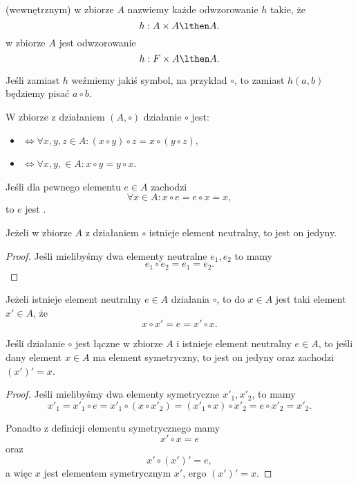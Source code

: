  (wewnętrznym) w zbiorze $A$ nazwiemy każde odwzorowanie $h$ takie, że
$$ h : A \times A \lthen A. $$
 w zbiorze $A$ jest odwzorowanie
$$ h : F \times A \lthen A. $$

Jeśli zamiast $h$ weźmiemy jakiś symbol, na przykład $\circ$, to zamiast $h(a, b)$ będziemy pisać $a \circ b$.

\begin{definition}
    W zbiorze z działaniem $(A, \circ)$ działanie $\circ$ jest:
    \begin{itemize}[--]
        \item {} $\iff \forall x, y, z \in A : (x \circ y) \circ z = x \circ (y \circ z)$,
        \item {} $\iff \forall x, y, \in A : x \circ y = y \circ x$.
    \end{itemize}
\end{definition}

Jeśli dla pewnego elementu $e \in A$ zachodzi
$$ \forall x \in A : x \circ e = e \circ x = x, $$
to $e$ jest .

\begin{fact}
    Jeżeli w zbiorze $A$ z działaniem $\circ$ istnieje element neutralny, to jest on jedyny.
\end{fact}
\begin{proof}
    Jeśli mielibyśmy dwa elementy neutralne $e_1, e_2$ to mamy
    $$ e_1 \circ e_2 = e_1 = e_2. $$
\end{proof}

Jeżeli istnieje element neutralny $e \in A$ działania $\circ$, to  do $x \in A$ jest taki element $x' \in A$, że
$$ x \circ x' = e = x' \circ x. $$

\begin{lemma}
    Jeśli działanie $\circ$ jest łączne w zbiorze $A$ i istnieje element neutralny $e \in A$, to jeśli dany element $x \in A$ ma element symetryczny, to jest on jedyny oraz zachodzi $(x')' = x$.
\end{lemma}
\begin{proof}
    Jeśli mielibyśmy dwa elementy symetryczne $x'_1, x'_2$, to mamy
    $$ x'_1 = x'_1 \circ e = x'_1 \circ (x \circ x'_2) = (x'_1 \circ x) \circ x'_2 = e \circ x'_2 = x'_2. $$

    Ponadto z definicji elementu symetrycznego mamy
    $$ x' \circ x = e $$
    oraz
    $$ x' \circ (x')' = e, $$
    a więc $x$ jest elementem symetrycznym $x'$, ergo $(x')' = x$.
\end{proof}

